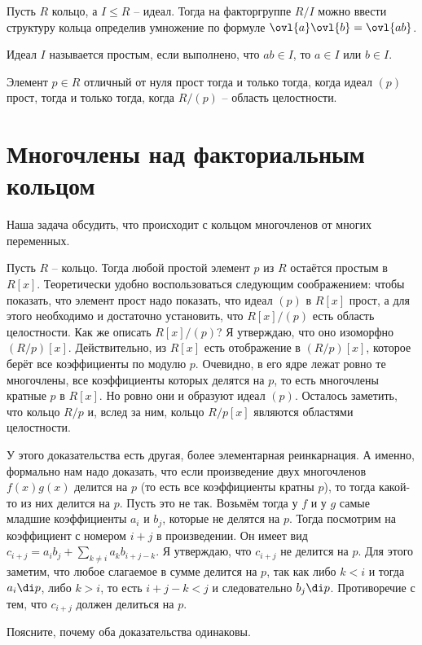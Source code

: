 \dfn Пусть $R$ кольцо, а $I\leq R$ -- идеал. Тогда на факторгруппе $R/I$ можно ввести структуру кольца определив умножение по формуле $\ovl{a}\ovl{b}=\ovl{ab}$. 
\edfn

\dfn Идеал $I$ называется простым, если выполнено, что $ab\in I$, то $a\in I$ или $b\in I$.
\edfn

\rm Элемент $p\in R$ отличный от нуля прост тогда и только тогда, когда идеал $(p)$ прост, тогда и только тогда, когда $R/(p)$ -- область целостности.
\erm


\section{Многочлены над факториальным кольцом}

Наша задача обсудить, что происходит с кольцом многочленов от многих переменных.


\lm[Гаусс] Пусть $R$ -- кольцо. Тогда любой простой элемент $p$ из $R$ остаётся простым в $R[x]$.
\proof
Теоретически удобно воспользоваться следующим соображением: чтобы показать, что элемент прост надо показать, что идеал $(p)$ в $R[x]$ прост, а для этого необходимо и достаточно установить, что $R[x]/(p)$ есть область целостности. Как же описать $R[x]/(p)$? Я утверждаю, что оно изоморфно $(R/p)[x]$. Действительно, из $R[x]$ есть отображение в $(R/p)[x]$, которое берёт все коэффициенты по модулю $p$. Очевидно, в его ядре лежат ровно те многочлены, все коэффициенты которых делятся на $p$, то есть многочлены кратные $p$ в $R[x]$. Но ровно они и образуют идеал $(p)$. Осталось заметить, что кольцо $R/p$ и, вслед за ним, кольцо $R/p[x]$ являются областями целостности.

У этого доказательства есть другая, более элементарная реинкарнация. А именно, формально нам надо доказать, что если произведение двух многочленов $f(x)g(x)$ делится на $p$ (то есть все коэффициенты кратны $p$), то тогда какой-то из них делится на $p$. Пусть это не так. Возьмём тогда у $f$ и у $g$ самые младшие коэффициенты $a_i$ и  $b_j$, которые не делятся на $p$. Тогда посмотрим на коэффициент с номером $i+j$  в произведении. Он имеет вид $c_{i+j}= a_ib_j + \sum_{k \neq i} a_k b_{i+j -k}$. Я утверждаю, что $c_{i+j}$ не делится на $p$. Для этого заметим, что любое слагаемое в сумме делится на $p$, так как либо $k<i$ и тогда $a_i \di p$, либо $k>i$, то есть $i+j-k<j$ и следовательно $b_j \di p$. Противоречие с тем, что $c_{i+j}$ должен делиться на $p$.   
\endproof
\elm

\upr Поясните, почему оба доказательства одинаковы.
\eupr


